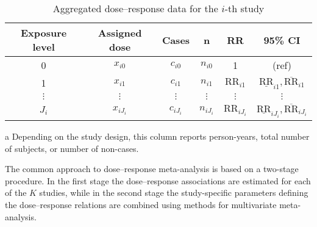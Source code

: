\begin{table}[]
\centering
\begin{threeparttable}
\caption{Aggregated dose--response data for the $i$-th study}
\label{table:singlestudy}
\begin{tabular}{cccccc}
\hline
\multicolumn{1}{c}{{\bf Exposure level}} & \multicolumn{1}{c}{{\bf Assigned dose}} & \multicolumn{1}{c}{{\bf Cases}} & \multicolumn{1}{c}{{\bf n}\tnote{a}} & \multicolumn{1}{c}{{\bf RR}} & \multicolumn{1}{c}{{\bf 95\% CI}} \\ \hline
0                                           & $x_{i0}$                                   & $c_{i0}$                           & $n_{i0}$                       & 1                                 & (ref)                                                \\
1                                           & $x_{i1}$                                   & $c_{i1}$                           & $n_{i1}$                       & $\mathrm{RR}_{i1}$                         & $\underline{\mathrm{RR}}_{i1}, \overline{\mathrm{RR}}_{i1}$             \\
$\vdots$                                    & $\vdots$                                & $\vdots$                        & $\vdots$                    & $\vdots$                                & $\vdots$                                           \\
$J_i$                                         & $x_{iJ_i}$                                 & $c_{iJ_i}$                           & $n_{iJ_i}$                       & $\mathrm{RR}_{iJ_i}$                         & $\underline{\mathrm{RR}}_{iJ_i}, \overline{\mathrm{RR}}_{iJ_i}$             \\ \hline
\end{tabular}
\begin{tablenotes}
\item [a] \footnotesize Depending on the study design, this column reports person-years, total number of subjects, or number of non-cases.
\end{tablenotes}
\end{threeparttable}
\end{table}

The common approach to dose--response meta-analysis is based on a two-stage procedure. In the first stage the  dose--response associations are estimated for each of the $K$ studies, while in the second stage the study-specific parameters defining the dose--response relations are combined using methods for multivariate meta-analysis.

